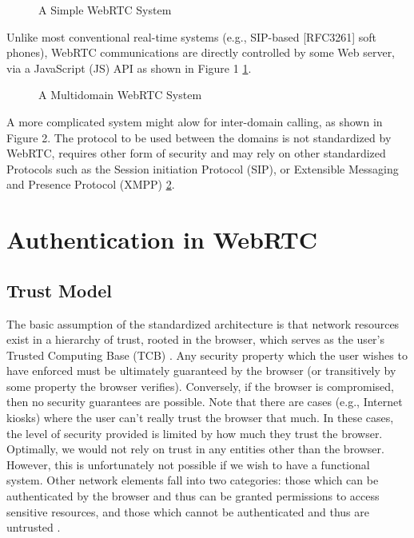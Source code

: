 \documentclass[conference]{IEEEtran}
\begin{document}
\begin{figure}[h]
    
    \caption{A Simple WebRTC System \cite{RFC8827}}
    \label{fig:signaling_architecture}
\end{figure}

Unlike most conventional real-time systems (e.g., SIP-based [RFC3261] soft phones), WebRTC 
communications are directly controlled by some Web server, via a JavaScript (JS) API as shown in Figure 1 \ref{fig:signaling_architecture}.

\begin{figure}[h]
    
    \caption{A Multidomain WebRTC System \cite{RFC8827}}
    \label{fig:multi_domain_architecture}
\end{figure}
A more complicated system might alow for inter-domain calling, as shown in Figure 2. The protocol to be used between the domains 
is not standardized by WebRTC, requires other form of security and may rely on other standardized Protocols such as the
Session initiation Protocol (SIP), or Extensible Messaging and Presence Protocol (XMPP) \cite{RFC8827} \ref{fig:multi_domain_architecture}. 


\section{Authentication in WebRTC}
\subsection{Trust Model}

The basic assumption of the standardized architecture is that network resources exist in a hierarchy of trust, rooted in the browser, 
which serves as the user's Trusted Computing Base (TCB) \cite{RFC8827}. Any security property which the user wishes to have enforced must be 
ultimately guaranteed by the browser (or transitively by some property the browser verifies). Conversely, if the browser is 
compromised, then no security guarantees are possible. Note that there are cases (e.g., Internet kiosks) where the user can't 
really trust the browser that much. In these cases, the level of security provided is limited by how much they trust the browser.
Optimally, we would not rely on trust in any entities other than the browser. However, this is unfortunately not possible 
if we wish to have a functional system. Other network elements fall into two categories: those which can be authenticated by 
the browser and thus can be granted permissions to access sensitive resources, and those which cannot be authenticated and 
thus are untrusted \cite{RFC8827}.
\end{document}
